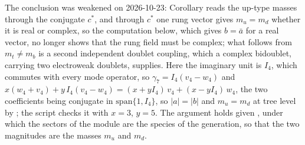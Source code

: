 The conclusion was weakened on 2026-10-23: Corollary  reads the up-type masses through the conjugate $c^{*}$, and through $c^{*}$ one rung vector gives $m_{u} = m_{d}$ whether it is real or complex, so the computation below, which gives $b = \bar{a}$ for a real vector, no longer shows that the rung field must be complex; what follows from $m_{t} \neq m_{b}$ is a second independent doublet coupling, which a complex bidoublet, carrying two electroweak doublets, supplies. Here the imaginary unit is $I_{4}$, which commutes with every mode operator, so $\gamma_{7} = I_{4}(v_{4} - w_{4})$ and $x(w_{4} + v_{4}) + y\,I_{4}(v_{4} - w_{4}) = (x + yI_{4})\,v_{4} + (x - yI_{4})\,w_{4}$, the two coefficients being conjugate in $\mathrm{span}\{1, I_{4}\}$, so $|a| = |b|$ and $m_{u} = m_{d}$ at tree level by ; the script checks it with $x = 3$, $y = 5$. The argument holds given , under which the sectors of the module are the species of the generation, so that the two magnitudes are the masses $m_{u}$ and $m_{d}$.
